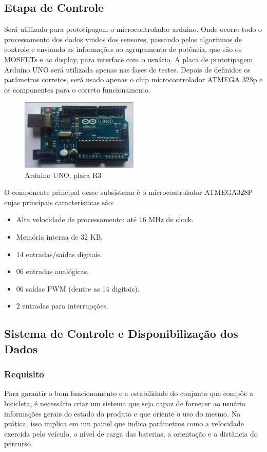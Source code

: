 	\subsection{Etapa de Controle}
	Será utilizado para prototipagem o microcontrolador arduino. Onde ocorre todo o processamento dos dados vindos dos sensores, passando pelos algoritmos de controle e enviando as informações ao agrupamento de potência, que são os MOSFETs e ao display, para interface com o usuário. A placa de prototipagem Arduino UNO será utilizada apenas nas fases de testes. Depois de definidos os parâmetros corretos, será usado apenas o chip microcontrolador ATMEGA 328p e os componentes para o correto funcionamento.
	\newpage
		
			\graphicspath{{figuras/}}
			\begin{figure}[h!]
				\centering
				\includegraphics[width=0.5\textwidth]{Figura5_Arduino_Uno.PNG}
				\caption{Arduino UNO, placa R3}
				\label{img:Arduino_Uno}
			\end{figure}
		
	O componente principal desse subsistema é o microcontrolador ATMEGA328P cujas principais características são:
		
	\begin{itemize}
			\item  Alta velocidade de processamento: até 16 MHz de clock.
			\item Memória interna de 32 KB.
			\item 14 entradas/saídas digitais.
			\item 06 entradas analógicas.
			\item  06 saídas PWM (dentre as 14 digitais).
			\item 2 entradas para interrupções.
		\end{itemize}
	
  
 	\subsection{Sistema de Controle e Disponibilização dos Dados}
 		\subsubsection{Requisito}
 		Para garantir o bom funcionamento e a estabilidade do conjunto que compõe a bicicleta, é necessário criar um sistema que seja capaz de fornecer ao usuário informações gerais do estado do produto e que oriente o uso do mesmo. Na prática, isso implica em um painel que indica parâmetros como a velocidade exercida pelo veículo, o nível de carga das baterias, a orientação e a distância do percurso.
 		
